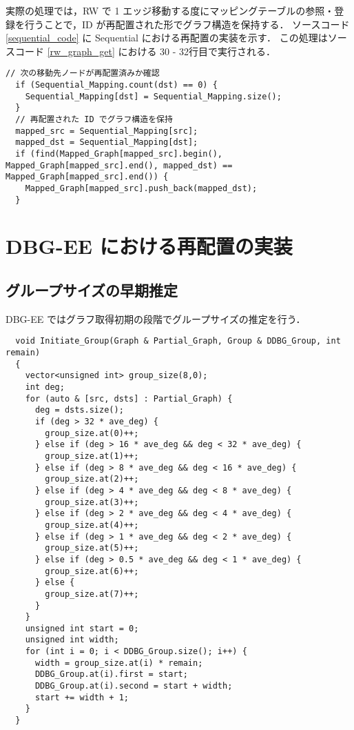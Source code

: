 実際の処理では，RW で 1 エッジ移動する度にマッピングテーブルの参照・登録を行うことで，ID が再配置された形でグラフ構造を保持する．
ソースコード \ref{sequential_code} に Sequential における再配置の実装を示す．
この処理はソースコード \ref{rw_graph_get} における 30 - 32行目で実行される． 
\begin{lstlisting}[caption=Sequential における再配置, label=sequential_code]
  // 次の移動先ノードが再配置済みか確認 
  if (Sequential_Mapping.count(dst) == 0) {
    Sequential_Mapping[dst] = Sequential_Mapping.size();
  }
  // 再配置された ID でグラフ構造を保持
  mapped_src = Sequential_Mapping[src];
  mapped_dst = Sequential_Mapping[dst];
  if (find(Mapped_Graph[mapped_src].begin(), Mapped_Graph[mapped_src].end(), mapped_dst) == Mapped_Graph[mapped_src].end()) {
    Mapped_Graph[mapped_src].push_back(mapped_dst);
  }
\end{lstlisting}
\section{DBG-EE における再配置の実装}
\subsection{グループサイズの早期推定}
DBG-EE ではグラフ取得初期の段階でグループサイズの推定を行う．
\begin{lstlisting}
  void Initiate_Group(Graph & Partial_Graph, Group & DDBG_Group, int remain)
  {
    vector<unsigned int> group_size(8,0);
    int deg;
    for (auto & [src, dsts] : Partial_Graph) {
      deg = dsts.size();
      if (deg > 32 * ave_deg) {
        group_size.at(0)++;
      } else if (deg > 16 * ave_deg && deg < 32 * ave_deg) {
        group_size.at(1)++;
      } else if (deg > 8 * ave_deg && deg < 16 * ave_deg) {
        group_size.at(2)++;
      } else if (deg > 4 * ave_deg && deg < 8 * ave_deg) {
        group_size.at(3)++;
      } else if (deg > 2 * ave_deg && deg < 4 * ave_deg) {
        group_size.at(4)++;
      } else if (deg > 1 * ave_deg && deg < 2 * ave_deg) {
        group_size.at(5)++;
      } else if (deg > 0.5 * ave_deg && deg < 1 * ave_deg) {
        group_size.at(6)++;
      } else {
        group_size.at(7)++;
      }
    }
    unsigned int start = 0; 
    unsigned int width;
    for (int i = 0; i < DDBG_Group.size(); i++) {
      width = group_size.at(i) * remain;
      DDBG_Group.at(i).first = start;
      DDBG_Group.at(i).second = start + width;
      start += width + 1;
    }
  }
\end{lstlisting}

